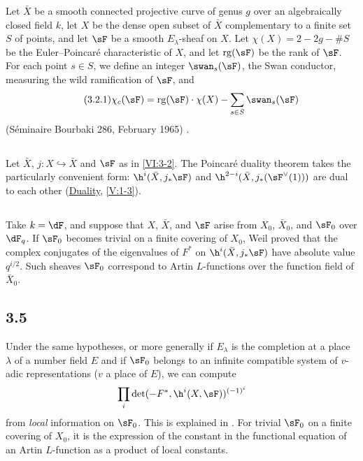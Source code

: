 Let $\bar X$ be a smooth connected projective curve of genus $g$ over an 
algebraically closed field $k$, let $X$ be the dense open subset of $\bar X$ 
complementary to a finite set $S$ of points, and let $\sF$ be a 
smooth $E_\lambda$-sheaf on $X$. Let $\chi(X)=2-2 g-\# S$ be the 
Euler--Poincaré characteristic of $X$, and let $\operatorname{rg}(\sF)$ be the 
rank of $\sF$. For each point $s\in S$, we define an integer 
$\swan_s(\sF)$, the Swan conductor, measuring the wild ramification of 
$\sF$, and 
\begin{align*}\tag{3.2.1}\label{VI:eq:3-2-1}
  \chi_c(\sF) = \operatorname{rg}(\sF) \cdot \chi(X) - \sum_{s\in S} \swan_s(\sF) 
\end{align*}
(Séminaire Bourbaki 286, February 1965) \cite{ra65}. 





\subsection{}\label{VI:3-3}

Let $\bar X$, $j:X\hookrightarrow\bar X$ and $\sF$ as in \ref{VI:3-2}. The 
Poincaré duality theorem takes the particularly convenient form: 
$\h^i(\bar X,j_\ast \sF)$ and $\h^{2-i}(\bar X,j_\ast(\sF^\vee(1)))$ are 
dual to each other (\hyperref[V]{Duality}, \ref{V:1-3}). 





\subsection{}\label{VI:3-4}

Take $k=\dF$, and suppose that $X$, $\bar X$, and $\sF$ arise from 
$X_0$, $\bar X_0$, and $\sF_0$ over $\dF_q$. If $\sF_0$ becomes trivial on a 
finite covering of $X_0$, Weil proved that the complex conjugates of 
the eigenvalues of $F^\ast$ on $\h^i(\bar X,j_\ast\sF)$ have absolute value 
$q^{i/2}$. Such sheaves $\sF_0$ correspond to Artin $L$-functions 
over the function field of $\bar X_0$. 





\subsection*{3.5}\label{VI:3-5_} %

Under the same hypotheses, or more generally if $E_\lambda$ is the 
completion at a place $\lambda$ of a number field $E$ and if $\sF_0$ 
belongs to an infinite compatible system of $v$-adic representations 
($v$ a place of $E$), we can compute 
\[
  \prod_i \det(-F^\ast,\h^i(X,\sF))^{(-1)^i} 
\]
from \emph{local} information on $\sF_0$. This is explained in 
\cite{de73}. For trivial $\sF_0$ on a finite covering of $X_0$, it is 
the expression of the constant in the functional equation of an Artin 
$L$-function as a product of local constants. 





